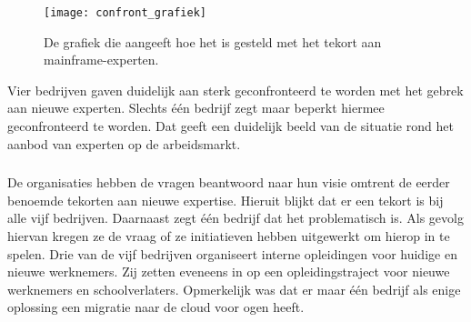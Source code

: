 \begin{figure}[h]
     \centering
     \texttt{[image: confront\_grafiek]}
     \caption{De grafiek die aangeeft hoe het is gesteld met het tekort aan mainframe-experten.}
     \label{fig: expertisetekort}
 \end{figure}

Vier bedrijven gaven duidelijk aan sterk geconfronteerd te worden met het gebrek aan nieuwe experten. Slechts één bedrijf zegt maar beperkt hiermee geconfronteerd te worden. Dat geeft een duidelijk beeld van de situatie rond het aanbod van experten op de arbeidsmarkt.

 \subsubsection{}
\label{sec:Wat is de visie van de bevraagde bedrijven rond expertise en welke initiatieve zetten ze hiervoor op?}

De organisaties hebben de vragen beantwoord naar hun visie omtrent de eerder benoemde tekorten aan nieuwe expertise. Hieruit blijkt dat er een tekort is bij alle vijf bedrijven. Daarnaast zegt één bedrijf dat het problematisch is. Als gevolg hiervan kregen ze de vraag of ze initiatieven hebben uitgewerkt om hierop in te spelen. Drie van de vijf bedrijven organiseert interne opleidingen voor huidige en nieuwe werknemers. Zij zetten eveneens in op een opleidingstraject voor nieuwe werknemers en schoolverlaters. Opmerkelijk was dat er maar één bedrijf als enige oplossing een migratie naar de cloud voor ogen heeft. 

\newpage

\subsubsection{}
\label{sec:Welke nadelen brengt het gebruik van een mainframe mee voor de organisatie?}

